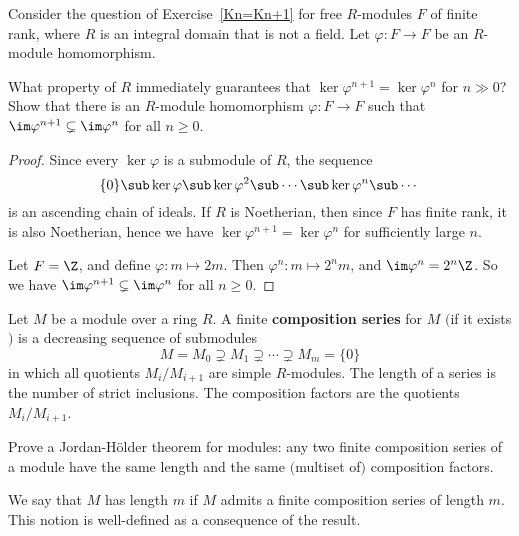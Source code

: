 \begin{exercise}
Consider the question of Exercise~\ref{Kn=Kn+1} for free $R$-modules $F$ of finite rank, where $R$ is an integral domain that is not a field. Let $\varphi:F\to F$ be an $R$-module homomorphism.\par
What property of $R$ immediately guarantees that $\ker\varphi^{n+1}=\ker\varphi^n$ for $n\gg0$?
Show that there is an $R$-module homomorphism $\varphi:F\to F$ such that $\im\varphi^{n+1}\subsetneq\im\varphi^n$ for all $n\geq 0$.
\end{exercise}
\begin{proof}
Since every $\ker\varphi$ is a submodule of $R$, the sequence
\[\{0\}\sub\ker\varphi\sub\ker\varphi^2\sub\cdots\sub\ker\varphi^n\sub\cdots\]
is an ascending chain of ideals. If $R$ is Noetherian, then since $F$ has finite rank, it is also Noetherian, hence we have $\ker\varphi^{n+1}=\ker\varphi^n$ for sufficiently large $n$.\par
Let $F=\Z$, and define $\varphi:m\mapsto 2m$. Then $\varphi^n:m\mapsto 2^nm$, and $\im\varphi^n=2^n\Z$. So we have $\im\varphi^{n+1}\subsetneq\im\varphi^n$ for all $n\geq 0$.
\end{proof}
\begin{exercise}
Let $M$ be a module over a ring $R$. A finite \textbf{composition series} for $M$ $($if it exists$)$ is a decreasing sequence of submodules
\[M=M_0\supsetneq M_1\supsetneq\cdots\supsetneq M_m=\{0\}\]
in which all quotients $M_i/M_{i+1}$ are simple $R$-modules. The length of a series is the number of strict inclusions. The composition factors are the quotients $M_i/M_{i+1}$.\par
Prove a Jordan-H\"older theorem for modules: any two finite composition series of a module have the same length and the same $($multiset of$)$ composition factors.\par
We say that $M$ has length $m$ if $M$ admits a finite composition series of length $m$. This notion is well-defined as a consequence of the result.
\end{exercise}
